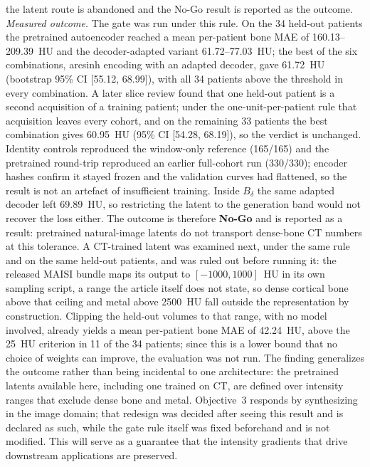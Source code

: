 \documentclass[9pt]{extarticle}
\begin{document}
\begin{enumerate}
the latent route is abandoned and the No-Go result is reported as the outcome. \emph{Measured outcome.} The gate was run under this rule. On the 34 held-out patients the pretrained autoencoder reached a mean per-patient bone MAE of 160.13--209.39~HU and the decoder-adapted variant 61.72--77.03~HU; the best of the six combinations, arcsinh encoding with an adapted decoder, gave 61.72~HU (bootstrap 95\% CI [55.12, 68.99]), with all 34 patients above the threshold in every combination. A later slice review found that one held-out patient is a second acquisition of a training patient; under the one-unit-per-patient rule that acquisition leaves every cohort, and on the remaining 33 patients the best combination gives 60.95~HU (95\% CI [54.28, 68.19]), so the verdict is unchanged. Identity controls reproduced the window-only reference (165/165) and the pretrained round-trip reproduced an earlier full-cohort run (330/330); encoder hashes confirm it stayed frozen and the validation curves had flattened, so the result is not an artefact of insufficient training. Inside $B_{\delta}$ the same adapted decoder left 69.89~HU, so restricting the latent to the generation band would not recover the loss either. The outcome is therefore \textbf{No-Go} and is reported as a result: pretrained natural-image latents do not transport dense-bone CT numbers at this tolerance. A CT-trained latent was examined next, under the same rule and on the same held-out patients, and was ruled out before running it: the released MAISI bundle \citep{guo2025maisi} maps its output to $[-1000, 1000]$~HU in its own sampling script, a range the article itself does not state, so dense cortical bone above that ceiling and metal above 2500~HU fall outside the representation by construction. Clipping the held-out volumes to that range, with no model involved, already yields a mean per-patient bone MAE of 42.24~HU, above the 25~HU criterion in 11 of the 34 patients; since this is a lower bound that no choice of weights can improve, the evaluation was not run. The finding generalizes the outcome rather than being incidental to one architecture: the pretrained latents available here, including one trained on CT, are defined over intensity ranges that exclude dense bone and metal. Objective~3 responds by synthesizing in the image domain; that redesign was decided after seeing this result and is declared as such, while the gate rule itself was fixed beforehand and is not modified. This will serve as a guarantee that the intensity gradients that drive downstream applications are preserved.

\end{enumerate}
\end{document}
